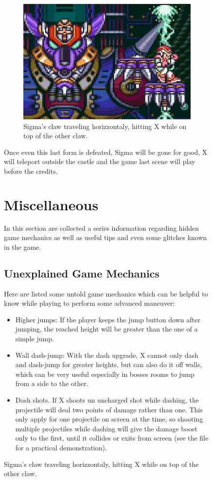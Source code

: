 \begin{figure}[htp]
\begin{figure}[htp]
	\centering
	\includegraphics[width=0.5\linewidth]{figures/X1/Sigma_stages/WolfSigma_claw_2.jpg}
	\caption{Sigma's claw traveling horizzontaly, hitting X while on top of the other claw.}
\end{figure}

Once even this last form is defeated, Sigma will be gone for good, X will teleport outside the castle and the game last scene will play before the credits.

\section{Miscellaneous}\label{X1:misc} %
In this section are collected a series information regarding hidden game mechanics as well as useful tips and even some glitches known in the game.

\subsection{Unexplained Game Mechanics}
Here are listed some untold game mechanics which can be helpful to know while playing\cite{RTA_wiki:X1} to perform some advanced maneuver: 
\begin{itemize}
	\item Higher jumps: If the player keeps the jump button down after jumping, the reached height will be greater than the one of a simple jump.
	
	\item Wall dash-jump: With the dash upgrade, X cannot only dash and dash-jump for greater heights, but can also do it off walls, which can be very useful especially in bosses rooms to jump from a side to the other.
	
	\item Dash shots. If X shoots un uncharged shot while dashing, the projectile will deal two points of damage rather than one. This only apply for one projectile on screen at the time, so shooting multiple projectiles while dashing will give the damage boost only to the first, until it collides or exits from screen (see the file  for a practical demonstration).
	

\end{itemize}
\end{figure}
